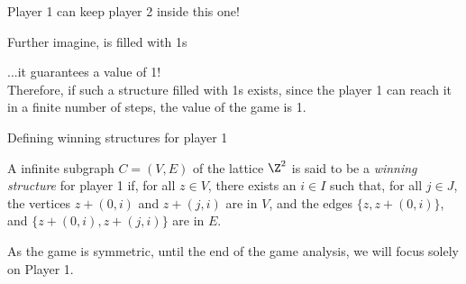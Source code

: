 \documentclass[11pt, mathserif]{beamer}
\begin{document}
    \begin{frame}{Player 1 can keep player 2 inside this one!}      
        \vspace{0.3cm}

        Further imagine, is filled with 1s
         
        \pause

        \vspace{0.3cm}
         ...it guarantees a value of 1!\\
        \vspace{0.3cm}
        \pause
         Therefore, if such a structure filled with 1s exists, since the player 1 can reach it in a finite number of steps, the value of the game is 1.
    \end{frame}


    \begin{frame}{Defining winning structures for player 1}  
        \begin{definition}\label{def-right-structure-game2}
            A infinite subgraph $C = (V, E)$ of the lattice $\Z^2$ is said to be a \emph{winning structure} for player 1 if, for all $z \in V$, there exists an $i \in I$ such that, for all $j \in J$, the vertices $z + (0, i)$ and $z + (j, i)$ are in $V$,  and the edges $\{z, z + (0, i)\}$, and $\{z + (0, i), z + (j, i)\}$ are in $E$. 
        \end{definition}

        \vspace{0.5cm}
        As the game is symmetric, until the end of the game analysis, we will focus solely on Player 1.
    \end{frame}
\end{document}
